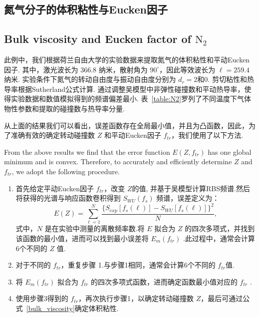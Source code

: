 \subsection{氮气分子的体积粘性与Eucken因子}
	\subsection{Bulk viscosity and Eucken factor of $\operatorname{N_2}$}

此例中，我们根据荷兰自由大学的实验数据\cite{guziyu}来提取氮气的体积粘性和平动Eucken因子. 其中，激光波长为 $ 366.8 $ 纳米，散射角为 $90^\circ$，因此等效波长为 $\ell=259.4$ 纳米. 实验条件下氮气的转动自由度与振动自由度分别为 $d_r=2$和0. 剪切粘性和热导率根据Sutherland公式计算. 通过调整吴模型中非弹性碰撞数和平动热导率，使得实验数据和数值模拟得到的频谱偏差最小. 表~\ref{table:N2}罗列了不同温度下气体物性参数和提取的碰撞数与热导率分量. %


从上面的结果我们可以看出，误差函数存在全局最小值，并且为凸函数，因此，为了准确有效的确定转动碰撞数 $Z$ 和平动Eucken因子 $f_{tr}$，我们使用了以下方法.

	From the above results we find that the error function $E(Z,f_{tr})$ has one global minimum and is convex. Therefore, to accurately and efficiently determine $Z$ and $f_{tr}$, we adopt the following procedure. 

\begin{enumerate}
	\item 首先给定平动Eucken因子 $f_{tr}$，改变 $Z$的值, 并基于吴模型计算RBS频谱.然后将获得的光谱与响应函数卷积得到 $S_{WU}(f_s)$ 频谱，误差定义为：
	\begin{equation}\label{fitting_error}
	E(Z)=\sum_{\ell=1}^N\frac{\{S_{exp}[f_s(\ell)]-S_{WU}[f_s(\ell)]\}^2}{N},
	\end{equation} 
	式中，$N$ 是在实验中测量的离散频率数.将 $E$ 拟合为 $Z$ 的四次多项式，并找到该函数的最小值，进而可以找到最小误差将 $E_m(f_{tr})$ .此过程中，通常会计算6个不同的 $Z$ 值.
	
	\item 对于不同的 $f_{tr}$，重复步骤 1.与步骤1相同，通常会计算6个不同的 $f_{tr}$值.
	
	\item 将 $E_m(f_{tr})$ 拟合为 $f_{tr}$ 的四次多项式函数，进而确定函数最小值对应的 $f_{tr}$ .
	
	\item 使用步骤3得到的 $f_{tr}$，再次执行步骤1，以确定转动碰撞数 $Z$，最后可通过公式~\eqref{bulk_viscosity}确定体积粘性.
\end{enumerate}




